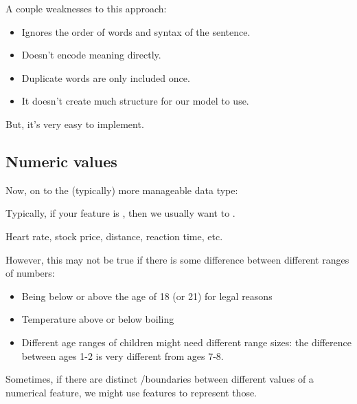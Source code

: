             A couple weaknesses to this approach:

            \begin{itemize}
                \item Ignores the order of words and syntax of the sentence.
                \item Doesn't encode meaning directly.
                \item Duplicate words are only included once.
                \item It doesn't create much structure for our model to use.
            \end{itemize}

            But, it's very easy to implement.

        \subsection{Numeric values}

            Now, on to the (typically) more manageable data type:\\

            \begin{concept}
                Typically, if your feature is , then we usually want to .
            \end{concept}

            \miniex Heart rate, stock price, distance, reaction time, etc.

            However, this may not be true if there is some difference between different ranges of numbers:

            \begin{itemize}
                \item Being below or above the age of 18 (or 21) for legal reasons
                \item Temperature above or below boiling
                \item Different age ranges of children might need different range sizes: the difference between ages 1-2 is very different from ages 7-8.\\
            \end{itemize}

            \begin{concept}
                Sometimes, if there are distinct /boundaries between different values of a numerical feature, we might use  features to represent those.
            \end{concept}

